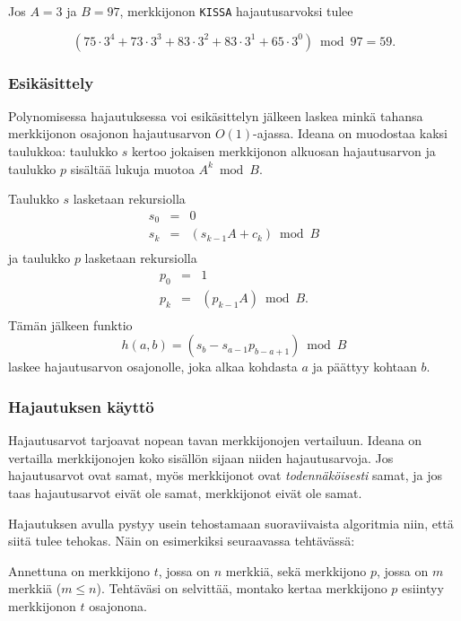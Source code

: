 Jos $A=3$ ja $B=97$, merkkijonon \texttt{KISSA} hajautusarvoksi tulee

\[(75 \cdot 3^4 + 73 \cdot 3^3 + 83 \cdot 3^2 + 83 \cdot 3^1 + 65 \cdot 3^0) \bmod 97 = 59.\]

\subsubsection*{Esikäsittely}

Polynomisessa hajautuksessa
voi esikäsittelyn jälkeen laskea minkä tahansa
merkkijonon osajonon hajautusarvon $O(1)$-ajassa.
Ideana on muodostaa kaksi taulukkoa:
taulukko $s$ kertoo jokaisen merkkijonon
alku\-osan hajautusarvon ja taulukko $p$
sisältää lukuja muotoa $A^k \bmod B$.

Taulukko $s$ lasketaan rekursiolla
\[
\begin{array}{lcl}
s_0 & = & 0 \\
s_k & = & (s_{k-1} A + c_k) \bmod B \\
\end{array}
\]
ja taulukko $p$ lasketaan rekursiolla
\[
\begin{array}{lcl}
p_0 & = & 1 \\
p_k & = & (p_{k-1} A) \bmod B. \\
\end{array}
\]
Tämän jälkeen funktio
\[h(a,b)=(s_b-s_{a-1} p_{b-a+1}) \bmod B \]
laskee hajautusarvon osajonolle,
joka alkaa kohdasta $a$ ja päättyy kohtaan $b$.

\subsubsection*{Hajautuksen käyttö}

Hajautusarvot tarjoavat nopean tavan merkkijonojen
vertailuun.
Ideana on vertailla merkkijonojen koko sisällön
sijaan niiden hajautusarvoja.
Jos hajautusarvot ovat samat,
myös merkkijonot ovat \textit{todennäköisesti} samat,
ja jos taas hajautusarvot eivät ole samat,
merkkijonot eivät ole samat.

Hajautuksen avulla pystyy usein tehostamaan
suoraviivaista algoritmia niin, että siitä tulee
tehokas. Näin on esimerkiksi seuraavassa tehtävässä:

\begin{task}
Annettuna on merkkijono $t$,
jossa on $n$ merkkiä,
sekä merkkijono $p$,
jossa on $m$ merkkiä ($m \le n$).
Tehtäväsi on selvittää, montako kertaa
merkkijono $p$ esiintyy merkkijonon $t$ osajonona.
\end{task}

